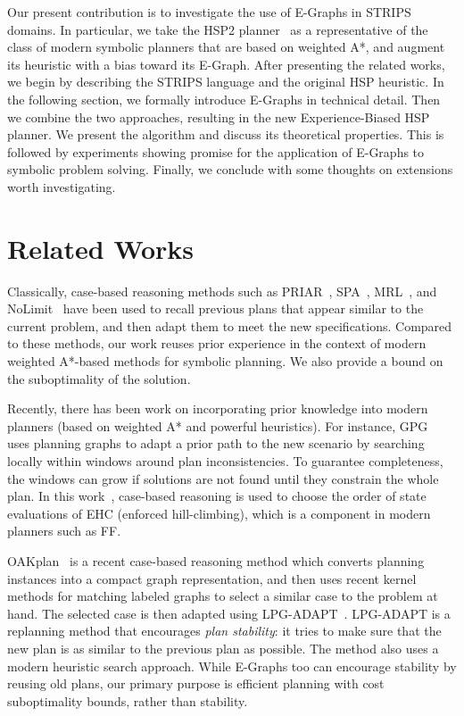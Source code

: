 \documentclass[letterpaper]{article}
\begin{document}
Our present contribution is to investigate the use of E-Graphs in STRIPS domains. In particular, we take the HSP2 planner~\cite{bonet2001planning} as a representative of the class of modern symbolic planners that are based on weighted A*, and augment its heuristic with a bias toward its E-Graph. After presenting the related works, we begin by describing the STRIPS language and the original HSP heuristic. In the following section, we formally introduce E-Graphs in technical detail. Then we combine the two approaches, resulting in the new Experience-Biased HSP planner. We present the algorithm and discuss its theoretical properties. This is followed by experiments showing promise for the application of E-Graphs to symbolic problem solving. Finally, we conclude with some thoughts on extensions worth investigating.

\section{Related Works}

Classically, case-based reasoning methods 
such as PRIAR~\cite{Kamb:92}, SPA~\cite{Hank:95}, MRL~\cite{Koeh:94}, and NoLimit~\cite{mljournal}
have been used to recall 
previous plans that appear similar to the current problem, and 
then adapt them to meet the new specifications.
Compared to these methods, our work reuses prior experience in
the context of modern weighted A*-based methods for symbolic planning. We also provide
a bound on the suboptimality of the solution.

Recently, there has been work on incorporating prior knowledge 
into modern planners (based on weighted A* and powerful heuristics).
For instance, GPG~\cite{Gere:00} uses planning graphs to adapt a prior path to the 
new scenario by searching locally within windows around plan 
inconsistencies. To guarantee completeness, the windows can grow 
if solutions are not found until they constrain the whole plan.
In this work~\cite{DBLP:conf/iccbr/RosaOB07}, case-based reasoning is used to choose the 
order of state evaluations of EHC (enforced hill-climbing), which 
is a component in modern planners such as FF. 

OAKplan~\cite{Serina:2010:KFC:1860143.1860472} is a recent 
case-based reasoning method which converts 
planning instances into a compact graph representation, and 
then uses recent kernel methods for matching labeled graphs to select
a similar case to the problem at hand. The selected case is then 
adapted using LPG-ADAPT~\cite{Fox06planstability}. LPG-ADAPT is a replanning method
that encourages \textit{plan stability}: it tries to make 
sure that the new plan is as similar to the previous plan as possible. 
The method also uses a modern heuristic search approach. While E-Graphs too can encourage stability by reusing old plans, our primary purpose is efficient planning with cost suboptimality bounds, rather than stability.
\end{document}
